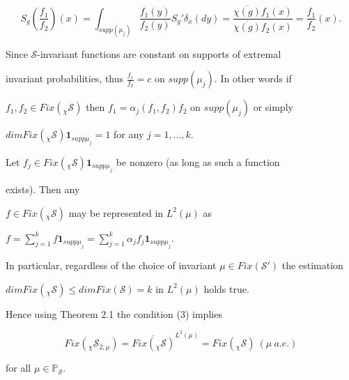 \documentclass{amsart}
\theoremstyle{definition}
\theoremstyle{remark}
\numberwithin{equation}{section}
\newcommand{\bs}{\rightline{$\blacksquare$}}
\begin{document}
$$

S_g\left(\frac{f_1}{f_2}\right) (x) = \int_{supp(\mu_j)} \frac{f_1(y)}{f_2(y)} S_g'\delta_x(dy) =

\frac{\overline{\chi(g)}f_1(x)}{\overline{\chi(g)}f_2(x)} = \frac{f_1}{f_2}(x).

$$

Since $\mathcal{S}$-invariant functions are constant on supports of extremal

invariant probabilities, thus $\frac{f_1}{f_2} = c$ on $supp(\mu_j)$. In other words if

$f_1, f_2 \in Fix(_{\chi}\mathcal{S})$ then $f_1 = \alpha_j(f_1, f_2)f_2$ on $supp(\mu_j)$ or simply

$dim Fix(_{\chi}\mathcal{S})\mathbf{1}_{supp \mu_j} = 1$ for any $j = 1, ... , k$.





Let $f_j\in Fix(_{\chi}\mathcal{S})\mathbf{1}_{supp \mu_j}$ be nonzero (as long as such a function

exists). Then any

$f\in Fix(_{\chi}\mathcal{S})$ may be represented  in  $L^2(\mu)$ as

$f = \sum_{j=1}^k f \mathbf{1}_{supp \mu_j} = \sum_{j=1}^k \alpha_jf_j\mathbf{1}_{supp \mu_j}$.

In particular, regardless of the choice of invariant $\mu \in Fix(\mathcal{S}')$ the estimation

$dim Fix(_{\chi}\mathcal{S}) \leq dim Fix(\mathcal{S}) = k $ in $L^2(\mu )$ holds true.

Hence using Theorem 2.1 the condition (3) implies

$$

Fix(_{\chi}\mathcal{S}_{2,\mu}) = \overline{Fix(_{\chi}\mathcal{S})}^{L^2(\mu)} = Fix(_{\chi}\mathcal{S}) \

(\mu \ a.e.)

$$

for all $\mu \in \mathbb{P}_{\mathcal{S}}$.



\bs
\end{document}
